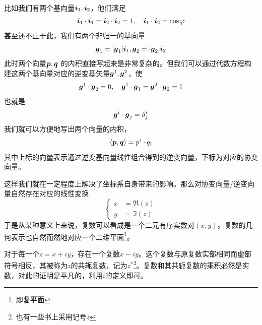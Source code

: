 \documentclass[12pt,a4paper,openany,twoside]{book}
\numberwithin{equation}{section}
\newcommand{\mean}[1]{\left\langle #1 \right\rangle}
\begin{document}
          比如我们有两个基向量$\vb*{i}_1,\vb*{i}_2$，他们满足
          \begin{equation*}
            \vb*{i}_1 \cdot \vb*{i}_1 = \vb*{i}_2 \cdot \vb*{i}_2 = 1, \quad \vb*{i}_1 \cdot \vb*{i}_2 = \cos{\varphi}
          \end{equation*} 
          甚至还不止于此，我们有两个非归一的基向量
          \begin{equation*}
            \vb*{g}_1 = \abs{\vb*{g}_1} \vb*{i}_1, \vb*{g}_2 = \abs{\vb*{g}_2} \vb*{i}_2
          \end{equation*} 
          此时两个向量$\vb*{p},\vb*{q}$ 的内积直接写起来是非常复杂的。但我们可以通过代数方程构建这两个基向量对应的逆变基矢量$\vb*{g}^1,\vb*{g}^2$，使
          \begin{equation*}
            \vb*{g}^1 \cdot \vb*{g}_2  = 0, \quad \vb*{g}^1 \cdot \vb*{g}_1 = \vb*{g}^2 \cdot \vb*{g}_2 = 1 
          \end{equation*} 
          也就是
          \begin{equation*}
            \vb*{g}^i \cdot \vb*{g}_j = \delta^i_j
          \end{equation*}
          我们就可以方便地写出两个向量的内积，
          \begin{equation*}
            \mean{\vb*{p},\vb*{q}} = p^i \cdot q_i
          \end{equation*} 
          其中上标的向量表示通过逆变基向量线性组合得到的逆变向量，下标为对应的协变向量。

          这样我们就在一定程度上解决了坐标系自身带来的影响。那么对协变向量/逆变向量自然存在对应的线性变换
          \begin{equation*}
            \begin{cases}
              x&=\Re(z)\\
              y&=\Im(z)
            \end{cases}
          \end{equation*}
          于是从某种意义上来说，复数可以看成是一个二元有序实数对$(x,y)$。复数的几何表示也自然而然地对应一个二维平面\footnote{即\textbf{复平面}}。

          对于每一个$z=x+iy$，存在一个复数$x-iy$。这个复数与原复数实部相同而虚部符号相反，其被称为$z$的共轭复数，记为$z^*$\footnote{也有一些书上采用记号$\bar{z}$}。复数和其共轭复数的乘积必然是实数，对此的证明是平凡的，利用$i$的定义即可。
          
\end{document}
